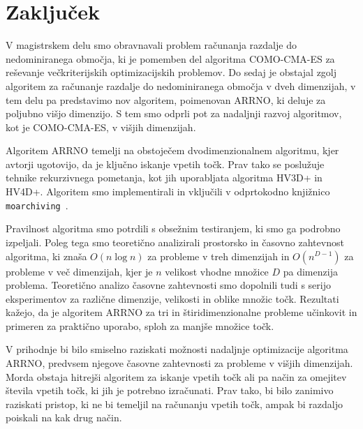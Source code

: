 \section{Zaključek}
\label{sec:zakljucek}
V magistrskem delu smo obravnavali problem računanja razdalje do nedominiranega območja, ki je pomemben del algoritma COMO-CMA-ES za reševanje večkriterijskih optimizacijskih problemov. Do sedaj je obstajal zgolj algoritem za računanje razdalje do nedominiranega območja v dveh dimenzijah, v tem delu pa predstavimo nov algoritem, poimenovan ARRNO, ki deluje za poljubno višjo dimenzijo. S tem smo odprli pot za nadaljnji razvoj algoritmov, kot je COMO-CMA-ES, v višjih dimenzijah.

Algoritem ARRNO temelji na obstoječem dvodimenzionalnem algoritmu, kjer avtorji ugotovijo, da je ključno iskanje vpetih točk. Prav tako se poslužuje tehnike rekurzivnega pometanja, kot jih uporabljata algoritma HV3D+ in HV4D+. Algoritem smo implementirali in vključili v odprtokodno knjižnico \texttt{moarchiving}~\cite{moarchiving}.

Pravilnost algoritma smo potrdili s obsežnim testiranjem, ki smo ga podrobno izpeljali. Poleg tega smo teoretično analizirali prostorsko in časovno zahtevnost algoritma, ki znaša $O(n \log n)$ za probleme v treh dimenzijah in $O(n^{D-1})$ za probleme v več dimenzijah, kjer je $n$ velikost vhodne množice $D$ pa dimenzija problema. Teoretično analizo časovne zahtevnosti smo dopolnili tudi s serijo eksperimentov za različne dimenzije, velikosti in oblike množic točk. Rezultati kažejo, da je algoritem ARRNO za tri in štiridimenzionalne probleme učinkovit in primeren za praktično uporabo, sploh za manjše množice točk.

V prihodnje bi bilo smiselno raziskati možnosti nadaljnje optimizacije algoritma ARRNO, predvsem njegove časovne zahtevnosti za probleme v višjih dimenzijah. Morda obstaja hitrejši algoritem za iskanje vpetih točk ali pa način za omejitev števila vpetih točk, ki jih je potrebno izračunati. Prav tako, bi bilo zanimivo raziskati pristop, ki ne bi temeljil na računanju vpetih točk, ampak bi razdaljo poiskali na kak drug način. 